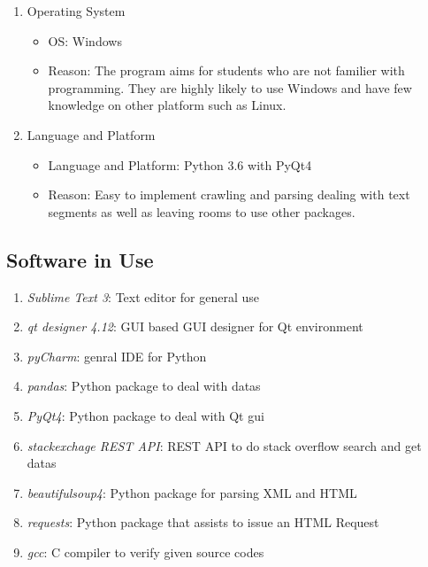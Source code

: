 \documentclass[conference]{IEEEtran}
\begin{document}
\begin{enumerate}
  \item Operating System
  \begin{itemize}
    \item OS: Windows
    \item Reason: The program aims for students who are not familier with programming. They are highly likely to use Windows and have few knowledge on other platform such as Linux.
  \end{itemize}
  \item Language and Platform
  \begin{itemize}
    \item Language and Platform: Python 3.6 with PyQt4
    \item Reason: Easy to implement crawling and parsing dealing with text segments as well as leaving rooms to use other packages.
  \end{itemize}
\end{enumerate}
\textit{}


\subsection{Software in Use} %
\label{sub:software_in_use}

\begin{enumerate}
  \item \textit{Sublime Text 3}: Text editor for general use
  \item \textit{qt designer 4.12}: GUI based GUI designer for Qt environment
  \item \textit{pyCharm}: genral IDE for Python
  \item \textit{pandas}: Python package to deal with datas
  \item \textit{PyQt4}: Python package to deal with Qt gui
  \item \textit{stackexchage REST API}: REST API to do stack overflow search and get datas
  \item \textit{beautifulsoup4}: Python package for parsing XML and HTML
  \item \textit{requests}: Python package that assists to issue an HTML Request
  \item \textit{gcc}: C compiler to verify given source codes
\end{enumerate}
\textit{}
\end{document}
